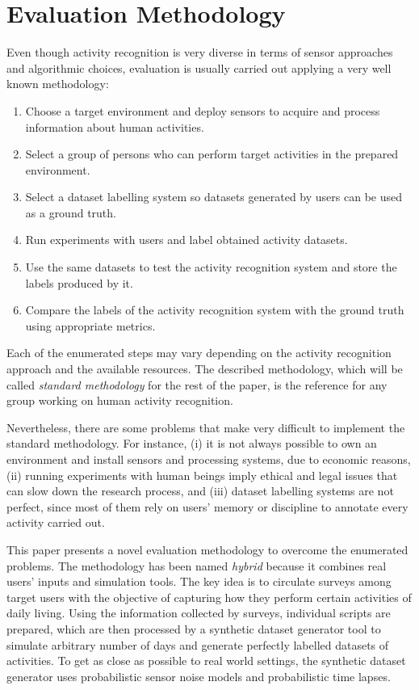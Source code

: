 \section{Evaluation Methodology}
\label{sec:evaluation:methodology}

Even though activity recognition is very diverse in terms of sensor approaches and algorithmic choices, evaluation is usually carried out applying a very well known methodology:

\begin{enumerate}
 \item Choose a target environment and deploy sensors to acquire and process information about human activities. 
 \item Select a group of persons who can perform target activities in the prepared environment.
 \item Select a dataset labelling system so datasets generated by users can be used as a ground truth.
 \item Run experiments with users and label obtained activity datasets.
 \item Use the same datasets to test the activity recognition system and store the labels produced by it.
 \item Compare the labels of the activity recognition system with the ground truth using appropriate metrics.
\end{enumerate}


Each of the enumerated steps may vary depending on the activity recognition approach and the available resources. The described methodology, which will be called \textit{standard methodology} for the rest of the paper, is the reference for any group working on human activity recognition.

Nevertheless, there are some problems that make very difficult to implement the standard methodology. For instance, (i) it is not always possible to own an environment and install sensors and processing systems, due to economic reasons, (ii) running experiments with human beings imply ethical and legal issues that can slow down the research process, and (iii) dataset labelling systems are not perfect, since most of them rely on users' memory or discipline to annotate every activity carried out. 

This paper presents a novel evaluation methodology to overcome the enumerated problems. The methodology has been named \textit{hybrid} because it combines real users' inputs and simulation tools. The key idea is to circulate surveys among target users with the objective of capturing how they perform certain activities of daily living. Using the information collected by surveys, individual scripts are prepared, which are then processed by a synthetic dataset generator tool to simulate arbitrary number of days and generate perfectly labelled datasets of activities. To get as close as possible to real world settings, the synthetic dataset generator uses probabilistic sensor noise models and probabilistic time lapses.

